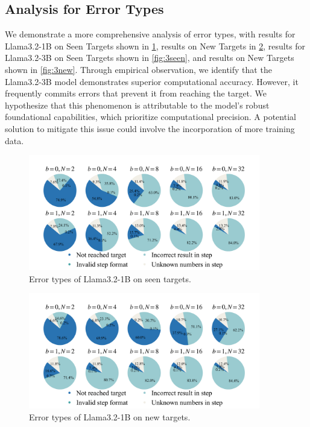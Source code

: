 \documentclass{article}
\theoremstyle{plain}
\theoremstyle{definition}
\theoremstyle{remark}
\begin{document}
\subsection{Analysis for Error Types}
\label{app:error}
We demonstrate a more comprehensive analysis of error types, with results for Llama3.2-1B on Seen Targets shown in \ref{fig:1seen}, results on New Targets in \ref{fig:1new}, results for Llama3.2-3B on Seen Targets shown in \ref{fig:3seen}, and results on New Targets shown in \ref{fig:3new}.
Through empirical observation, we identify that the Llama3.2-3B model demonstrates superior computational accuracy. However, it frequently commits errors that prevent it from reaching the target. We hypothesize that this phenomenon is attributable to the model's robust foundational capabilities, which prioritize computational precision. A potential solution to mitigate this issue could involve the incorporation of more training data.

\begin{figure}[htbp]
  \centering
\includegraphics[width=0.9\textwidth]{fig/pie_charts.png}
  \caption{Error types of Llama3.2-1B on seen targets.}
  \label{fig:1seen}
\end{figure}

\begin{figure}[htbp]
  \centering
\includegraphics[width=0.9\textwidth]{fig/pie_charts2.png}
  \caption{Error types of Llama3.2-1B on new targets.}
  \label{fig:1new}
\end{figure}
\end{document}
